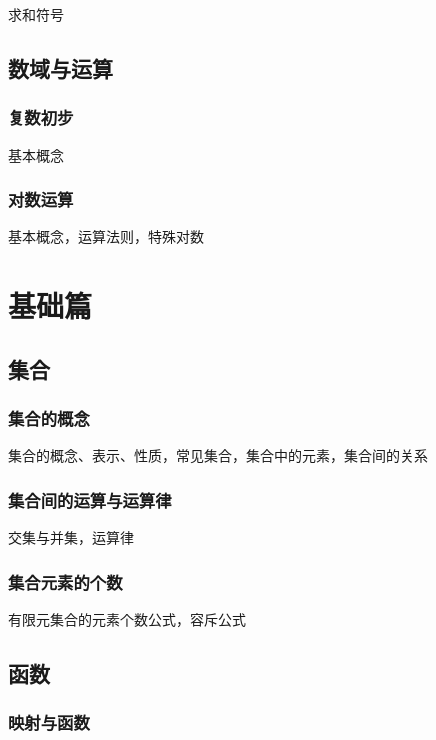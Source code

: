 \documentclass[lang=cn, zihao=4.5]{elegantbook}
\begin{document}
求和符号

\chapter{数域与运算}

\section{复数初步}

基本概念

\section{对数运算}

基本概念，运算法则，特殊对数

\part{基础篇}

\setcounter{chapter}{0}
\chapter{集合}

\section{集合的概念}

集合的概念、表示、性质，常见集合，集合中的元素，集合间的关系

\section{集合间的运算与运算律}

交集与并集，运算律

\section{集合元素的个数}

有限元集合的元素个数公式，容斥公式

\chapter{函数}

\section{映射与函数}
\end{document}
